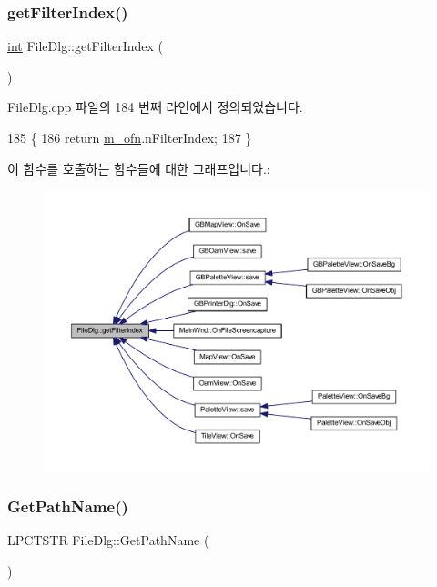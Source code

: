 \subsubsection{\texorpdfstring{get\+Filter\+Index()}{getFilterIndex()}}
{\footnotesize\ttfamily \mbox{\hyperlink{_util_8cpp_a0ef32aa8672df19503a49fab2d0c8071}{int}} File\+Dlg\+::get\+Filter\+Index (\begin{DoxyParamCaption}{ }\end{DoxyParamCaption})\hspace{0.3cm}{\ttfamily [virtual]}}



File\+Dlg.\+cpp 파일의 184 번째 라인에서 정의되었습니다.


\begin{DoxyCode}
185 \{
186   \textcolor{keywordflow}{return} \mbox{\hyperlink{class_file_dlg_a3ee514d5dca456bd90c598af5412269a}{m\_ofn}}.nFilterIndex;
187 \}
\end{DoxyCode}
이 함수를 호출하는 함수들에 대한 그래프입니다.\+:
\nopagebreak
\begin{figure}[H]
\begin{center}
\leavevmode
\includegraphics[width=350pt]{class_file_dlg_adee4c9560d3c2668654c50970f8e7f12_icgraph}
\end{center}
\end{figure}
\mbox{\label{class_file_dlg_a52be84d9ca25a4d4dbb1f5e0ed1404bd}} 
\subsubsection{\texorpdfstring{Get\+Path\+Name()}{GetPathName()}}
{\footnotesize\ttfamily L\+P\+C\+T\+S\+TR File\+Dlg\+::\+Get\+Path\+Name (\begin{DoxyParamCaption}{ }\end{DoxyParamCaption})}



